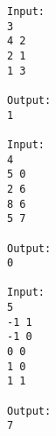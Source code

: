 \begin{verbatim}
Input:
3
4 2
2 1
1 3

Output:
1

Input:
4
5 0
2 6
8 6
5 7

Output:
0

Input:
5
-1 1
-1 0
0 0
1 0
1 1

Output:
7
\end{verbatim}